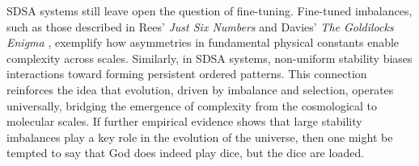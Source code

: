 \documentclass[preprint,12pt]{elsarticle}
\begin{document}
SDSA systems still leave open the question of fine-tuning. Fine-tuned imbalances, such as those described in Rees' \textit{Just Six Numbers} \cite{rees2000just} and Davies' \textit{The Goldilocks Enigma} \cite{davies2006goldilocks}, exemplify how asymmetries in fundamental physical constants enable complexity across scales. Similarly, in SDSA systems,  non-uniform stability biases interactions toward forming persistent ordered patterns. This connection reinforces the idea that evolution, driven by imbalance and selection, operates universally, bridging the emergence of complexity from the cosmological to molecular scales. If further empirical evidence shows that large stability imbalances play a key role in the evolution of the universe, then one might be tempted to say that God does indeed play dice, but the dice are loaded.



\vspace{6pt} 



\end{document}
